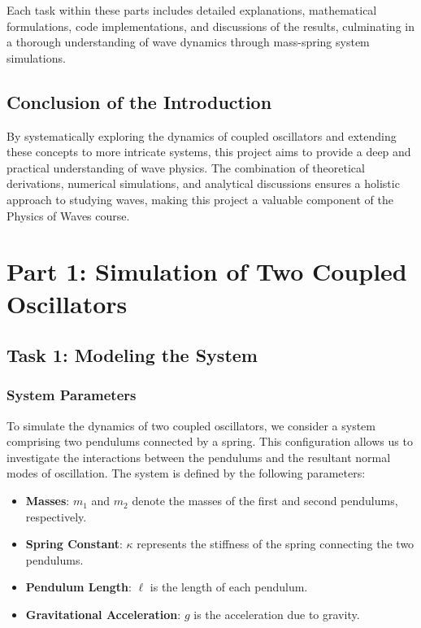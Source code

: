 \documentclass[12pt]{report} %
\begin{document}
Each task within these parts includes detailed explanations, mathematical formulations, code implementations, and discussions of the results, culminating in a thorough understanding of wave dynamics through mass-spring system simulations.

\section{Conclusion of the Introduction}

By systematically exploring the dynamics of coupled oscillators and extending these concepts to more intricate systems, this project aims to provide a deep and practical understanding of wave physics. The combination of theoretical derivations, numerical simulations, and analytical discussions ensures a holistic approach to studying waves, making this project a valuable component of the Physics of Waves course.

\chapter{Part 1: Simulation of Two Coupled Oscillators}
\label{chap:part1}

    \section{Task 1: Modeling the System}
    \label{sec:part1_task1}
    
    \subsection{System Parameters}
    \label{subsec:part1_task1_parameters}
    
    To simulate the dynamics of two coupled oscillators, we consider a system comprising two pendulums connected by a spring. This configuration allows us to investigate the interactions between the pendulums and the resultant normal modes of oscillation. The system is defined by the following parameters:
    
    \begin{itemize}
        \item \textbf{Masses}: \( m_1 \) and \( m_2 \) denote the masses of the first and second pendulums, respectively.
        \item \textbf{Spring Constant}: \( \kappa \) represents the stiffness of the spring connecting the two pendulums.
        \item \textbf{Pendulum Length}: \( \ell \) is the length of each pendulum.
        \item \textbf{Gravitational Acceleration}: \( g \) is the acceleration due to gravity.
    \end{itemize}
    
\end{document}
